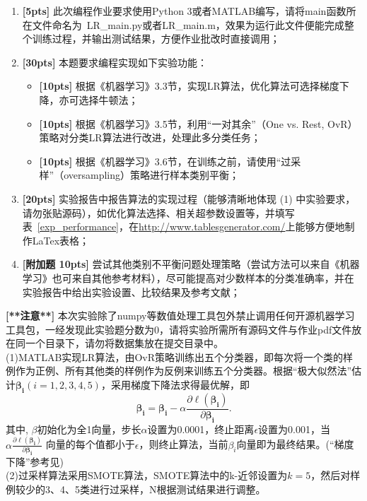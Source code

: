 \documentclass[a4paper,UTF8]{article}
\numberwithin{equation}{section}
\begin{document}
\begin{enumerate}[(1)]
    \item \textbf{[5pts]} 此次编程作业要求使用Python 3或者MATLAB编写，请将main函数所在文件命名为~LR\_main.py或者LR\_main.m，效果为运行此文件便能完成整个训练过程，并输出测试结果，方便作业批改时直接调用；	
	\item \textbf{[30pts]} 本题要求编程实现如下实验功能：
	\begin{itemize}
		\item \textbf{[10pts]} 根据《机器学习》3.3节，实现LR算法，优化算法可选择梯度下降，亦可选择牛顿法；
		\item \textbf{[10pts]} 根据《机器学习》3.5节，利用“一对其余”（One vs. Rest, OvR）策略对分类LR算法进行改进，处理此多分类任务；
		\item \textbf{[10pts]} 根据《机器学习》3.6节，在训练之前，请使用“过采样”（oversampling）策略进行样本类别平衡；
	\end{itemize}
	
	

	\item \textbf{[20pts]} 实验报告中报告算法的实现过程（能够清晰地体现 (1) 中实验要求，请勿张贴源码），如优化算法选择、相关超参数设置等，并填写表~\ref{exp_performance}，在\url{http://www.tablesgenerator.com/}上能够方便地制作LaTex表格；
	
	\item \textbf{[附加题 10pts]} 尝试其他类别不平衡问题处理策略（尝试方法可以来自《机器学习》也可来自其他参考材料），尽可能提高对少数样本的分类准确率，并在实验报告中给出实验设置、比较结果及参考文献；
\end{enumerate}
\noindent \textbf{[**注意**]} 本次实验除了numpy等数值处理工具包外禁止调用任何开源机器学习工具包，一经发现此实验题分数为0，请将实验所需所有源码文件与作业pdf文件放在同一个目录下，请勿将数据集放在提交目录中。
\newpage
{}\\
(1)MATLAB实现LR算法，由OvR策略训练出五个分类器，即每次将一个类的样例作为正例、所有其他类的样例作为反例来训练五个分类器。根据“极大似然法”估计$\bm{\beta_i}(i=1,2,3,4,5)$，采用梯度下降法求得最优解，即
\[
    \bm{\beta_i} = \bm{\beta_i} - \alpha\frac{\partial\ell(\bm{\beta_i})}{\partial\bm{\beta_i}}.
\]
其中, $\beta$初始化为全1向量，步长$\alpha$设置为0.0001，终止距离$\epsilon$设置为0.001，当$\alpha\frac{\partial\ell(\bm{\beta_i})}{\partial\bm{\beta_i}}$ 向量的每个值都小于$\epsilon$，则终止算法，当前$\beta_i$向量即为最终结果。(“梯度下降”参考见\cite{ref3})\\
(2)过采样算法采用SMOTE算法，SMOTE算法中的k-近邻设置为$k=5$，然后对样例较少的3、4、5类进行过采样，N根据测试结果进行调整。
\end{document}
